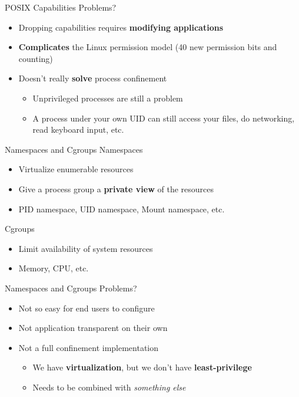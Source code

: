 \documentclass[12pt, dvipsnames, aspectratio=169]{beamer}
\begin{document}
\begin{frame}[c]{POSIX Capabilities}
Problems?
\begin{itemize}
    \item Dropping capabilities requires \textbf{modifying applications}
    \item \textbf{Complicates} the Linux permission model (40 new permission bits and counting)
    \item Doesn't really \textbf{solve} process confinement
    \begin{itemize}
        \item Unprivileged processes are still a problem
        \item A process under your own UID can still access your files, do networking, read keyboard input, etc.
    \end{itemize}
\end{itemize}
\end{frame}

\begin{frame}[c]{Namespaces and Cgroups}
Namespaces
\begin{itemize}
    \item Virtualize enumerable resources
    \item Give a process group a \textbf{private view} of the resources
    \item PID namespace, UID namespace, Mount namespace, etc.
\end{itemize}
\vfill
Cgroups
\begin{itemize}
    \item Limit availability of system resources
    \item Memory, CPU, etc.
\end{itemize}
\end{frame}

\begin{frame}[c]{Namespaces and Cgroups}
Problems?
\begin{itemize}
    \item Not so easy for end users to configure
    \item Not application transparent on their own
    \item Not a full confinement implementation
    \begin{itemize}
        \item We have \textbf{virtualization}, but we don't have \textbf{least-privilege}
        \item Needs to be combined with \textit{something else}
    \end{itemize}
\end{itemize}
\end{frame}
\end{document}
